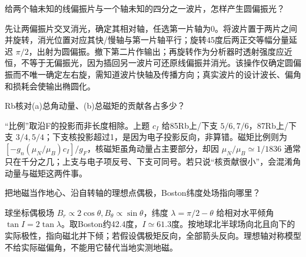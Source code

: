 \begin{exercise}\label{task:exp11-4}
给两个轴未知的线偏振片与一个轴未知的四分之一波片，怎样产生圆偏振光？
\end{exercise}
\begin{solution}
先让两偏振片交叉消光，确定其相对轴，任选第一片轴为0。将波片置于两片之间并旋转，消光位置对应其快/慢轴与第一片轴平行；旋转45度后两正交等幅分量延迟 $\pi/2$，出射为圆偏振。撤下第二片作输出；再旋转作为分析器时透射强度应近恒，不等于无偏振光，因为插回另一波片可还原线偏振并消光。该操作仅确定圆偏振而不唯一确定左右旋，需知道波片快轴及传播方向；真实波片的设计波长、偏角和损耗会使输出椭圆化。
\end{solution}
\begin{exercise}\label{task:exp11-5}
Rb核对(a)总角动量、(b)总磁矩的贡献各占多少？
\end{exercise}
\begin{solution}
“比例”取沿F的投影而非长度相除。上题 $c_I$ 给85Rb上/下支 $5/6,7/6$，87Rb上/下支 $3/4,5/4$；下支核投影超过1，是因为电子投影反向，非算错。磁矩比例则为 $[-g_n(\mu_N/\mu_B)c_I]/g_F$，核磁矩虽角动量占主要部分，却因 $\mu_N/\mu_B\simeq1/1836$ 通常只在千分之几；上支与电子项反号、下支可同号。若只说“核贡献很小”，会混淆角动量与磁矩这两件事。
\end{solution}
\begin{exercise}\label{task:exp11-6}
把地磁当作地心、沿自转轴的理想点偶极，Boston纬度处场指向哪里？
\end{exercise}
\begin{solution}
球坐标偶极场 $B_r\propto2\cos\theta,B_\theta\propto\sin\theta$，纬度 $\lambda=\pi/2-\theta$ 给相对水平倾角 $\tan I=2\tan\lambda$。取Boston约42.4度，$I\simeq61.3$度。按地球北半球场向北且向下的实际极性，指向磁北并下倾；若假设偶极矩反向，全部箭头反向。理想轴对称模型不给实际磁偏角，不能用它替代当地实测地磁。
\end{solution}

